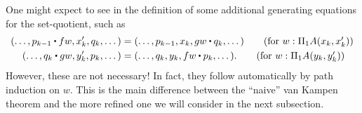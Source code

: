 \documentclass[hott-all.tex]{subfiles}
\begin{document}
\begin{rmk}
  One might expect to see in the definition of \code some additional generating equations for the set-quotient, such as
  \begin{align*}
    (\dots, p_{k-1} \ct fw, x_{k}', q_{k}, \dots) &=
    (\dots, p_{k-1}, x_{k}, gw \ct q_{k}, \dots)
    \tag{for $w:\Pi_1A(x_{k},x_{k}')$}\\
    (\dots, q_k \ct gw, y_k', p_k, \dots) &=
    (\dots, q_k, y_k, fw \ct p_k, \dots).
    \tag{for $w:\Pi_1A(y_k, y_k')$}
  \end{align*}
  However, these are not necessary!
  In fact, they follow automatically by path induction on $w$.
  This is the main difference between the ``naive'' van Kampen theorem and the more refined one we will consider in the next subsection.
\end{rmk}
% 
% 
\end{document}
